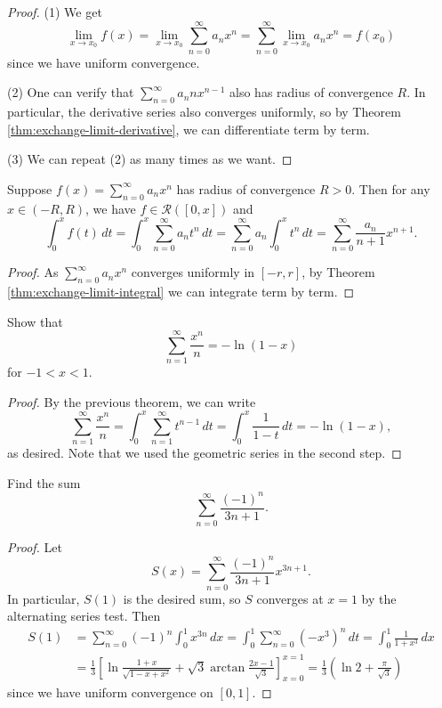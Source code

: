\begin{proof}
  (1) We get
  \[
    \lim_{x \to x_0} f(x)
    = \lim_{x \to x_0} \sum_{n = 0}^\infty a_n x^n
    = \sum_{n = 0}^\infty \lim_{x \to x_0} a_n x^n
    = f(x_0)
  \]
  since we have uniform convergence.

  (2) One can verify that $\sum_{n = 0}^\infty a_n n x^{n - 1}$
  also has radius of convergence $R$. In particular, the
  derivative series also converges uniformly, so
  by Theorem \ref{thm:exchange-limit-derivative}, we can
  differentiate term by term.

  (3) We can repeat (2) as many times as we want.
\end{proof}

\begin{theorem}
  Suppose $f(x) = \sum_{n = 0}^\infty a_n x^n$ has radius
  of convergence $R > 0$. Then for any $x \in (-R, R)$,
  we have $f \in \mathcal{R}([0, x])$ and
  \[
    \int_0^x f(t)\, dt = \int_0^x \sum_{n = 0}^\infty a_n t^n\, dt
    = \sum_{n = 0}^\infty a_n \int_0^x t^n\, dt
    = \sum_{n = 0}^\infty \frac{a_n}{n + 1} x^{n + 1}.
  \]
\end{theorem}

\begin{proof}
  As $\sum_{n = 0}^\infty a_n x^n$ converges
  uniformly in $[-r, r]$, by Theorem \ref{thm:exchange-limit-integral}
  we can integrate term by term.
\end{proof}

\begin{example}
  Show that
  \[
    \sum_{n = 1}^\infty \frac{x^n}{n} = -\ln(1 - x)
  \]
  for $-1 < x < 1$.
\end{example}

\begin{proof}
  By the previous theorem, we can write
  \[
    \sum_{n = 1}^\infty \frac{x^n}{n}
    = \int_0^x \sum_{n = 1}^\infty t^{n - 1}\, dt
    = \int_0^x \frac{1}{1 - t} \, dt
    = -\ln(1 - x),
  \]
  as desired. Note that we used the geometric
  series in the second step.
\end{proof}

\begin{example}
  Find the sum
  \[
    \sum_{n = 0}^\infty \frac{(-1)^n}{3n + 1}.
  \]
\end{example}

\begin{proof}
  Let
  \[
    S(x) = \sum_{n = 0}^\infty \frac{(-1)^n}{3n + 1} x^{3n + 1}.
  \]
  In particular, $S(1)$ is the desired sum, so $S$
  converges at $x = 1$
  by the alternating series test. Then
  \begin{align*}
    S(1)
    &= \sum_{n = 0}^\infty (-1)^n \int_0^1 x^{3n}\, dx
    = \int_0^1 \sum_{n = 0}^\infty (-x^3)^n \, dt
    = \int_0^1 \frac{1}{1 + x^3}\, dx \\
    &= \frac{1}{3} \left[\ln \frac{1 + x}{\sqrt{1 - x + x^2}} + \sqrt{3} \arctan \frac{2x - 1}{\sqrt{3}}\right]_{x = 0}^{x = 1}
    = \frac{1}{3} \left(\ln 2 + \frac{\pi}{\sqrt{3}}\right)
  \end{align*}
  since we have uniform convergence on $[0, 1]$.
\end{proof}
